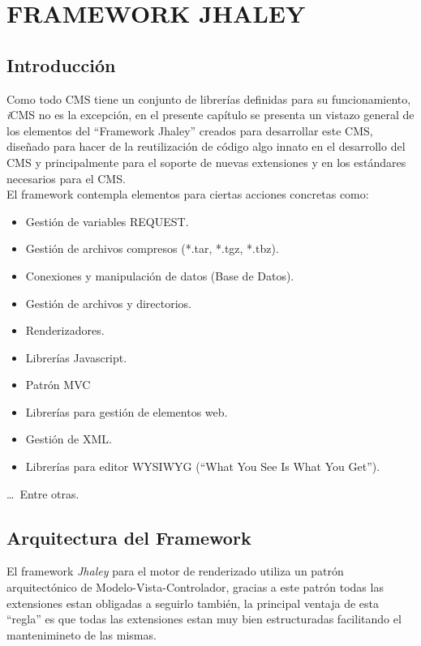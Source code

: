 \chapter{FRAMEWORK JHALEY}
\newpage
\section{Introducci\'on}
Como todo CMS tiene un conjunto de librer\'ias definidas para su funcionamiento, \textit{i}CMS no es la excepci\'on, en el presente cap\'itulo se presenta un vistazo general de los elementos del ``Framework Jhaley'' creados para desarrollar este CMS, dise\~nado para hacer de la reutilizaci\'on de c\'odigo algo innato en el desarrollo del CMS y principalmente para el soporte de nuevas extensiones y en los est\'andares necesarios para el CMS.\\
El framework contempla elementos para ciertas acciones concretas como: 
\begin{itemize}
\item Gesti\'on de variables REQUEST.
\item Gesti\'on de archivos compresos (*.tar, *.tgz, *.tbz).
\item Conexiones y manipulaci\'on de datos (Base de Datos).
\item Gesti\'on de archivos y directorios.
\item Renderizadores.
\item Librer\'ias Javascript.
\item Patr\'on MVC
\item Librer\'ias para gesti\'on de elementos web.
\item Gesti\'on de XML.
\item Librer\'ias para editor WYSIWYG (``What You See Is What You Get'').
\end{itemize}
\ldots\ Entre otras.

\section{Arquitectura del Framework}
El framework \textit{Jhaley} para el motor de renderizado utiliza un patr\'on arquitect\'onico de Modelo-Vista-Controlador, gracias a este patr\'on todas las extensiones estan obligadas a seguirlo tambi\'en, la principal ventaja de esta ``regla'' es que todas las extensiones estan muy bien estructuradas facilitando el mantenimineto de las mismas.\\

